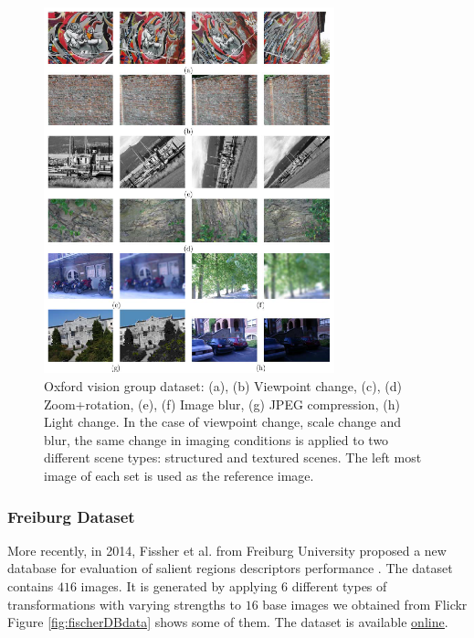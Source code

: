 \begin{figure}[H]
\begin{center}
\includegraphics[width=0.75\textwidth]{fig/MikDataset}
\end{center}
\caption{Oxford vision group dataset: (a), (b) Viewpoint change, (c), (d) Zoom+rotation, (e), (f) Image blur, (g) JPEG compression, (h) Light change. In the
case of viewpoint change, scale change and blur, the same change in imaging conditions is applied to two different scene types: structured and
textured scenes. The left most image of each set is used as the reference image.}
\label{fig:mikdataset}
\end{figure}


\subsubsection{Freiburg Dataset}
More recently, in 2014, Fissher et al. from Freiburg University  proposed a new database for evaluation of salient regions descriptors performance \cite{FischerDB14}. 
The dataset contains $416$ images. It is generated by applying $6$ different types of transformations with varying strengths to $16$ base images we obtained from Flickr
Figure \ref{fig:fischerDBdata} shows some of them. The dataset is available \href{http://lmb.informatik.uni-freiburg.de/resources/datasets/genmatch.en.html}{\underline{online}}.

